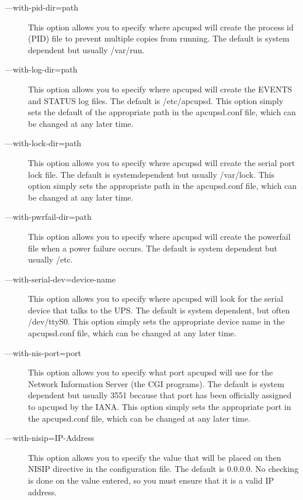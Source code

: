 \begin{description}
\item [{---}with-pid-dir=\lt{}path\gt{}]
   This option allows you to specify where apcupsd will create the process id
(PID) file to prevent multiple copies from running. The default is system
dependent but usually /var/run.  

\item [{---}with-log-dir=\lt{}path\gt{}]
   This option allows you to specify where apcupsd will create the EVENTS and
STATUS log files. The default is /etc/apcupsd. This option simply sets the
default of the appropriate path in the apcupsd.conf file, which can be changed
at any later time.  

\item [{---}with-lock-dir=\lt{}path\gt{}]
   This option allows you to specify where apcupsd will create the serial port
lock file. The default is systemdependent but usually /var/lock. This option
simply sets the appropriate path in the apcupsd.conf file, which can be
changed at any later time.  

\item [{---}with-pwrfail-dir=\lt{}path\gt{}]
   This option allows you to specify where apcupsd will create the powerfail file
when a power failure occurs. The default is system dependent but usually /etc.
 

\item [{---}with-serial-dev=\lt{}device-name\gt{}]
   This option allows you to specify where apcupsd will look for the serial
device that talks to the UPS. The default is system dependent, but often
/dev/ttyS0. This option simply sets the appropriate device name in the
apcupsd.conf file, which can be changed at any later time.  

\item [{---}with-nis-port=\lt{}port\gt{}]
   This option allows you to specify what port apcupsd will use for the Network
Information Server (the CGI programs). The default is system dependent but
usually 3551 because that port has been officially assigned to apcupsd by the
IANA. This option simply sets the appropriate port in the apcupsd.conf file,
which can be changed at any later time.  

\item [{---}with-nisip=\lt{}IP-Address\gt{}]
   This option allows you to specify the value that will be placed on then NISIP
directive in the configuration file. The default is 0.0.0.0. No checking is
done on the value entered, so you must ensure that it is a valid IP address.  


\end{description}
